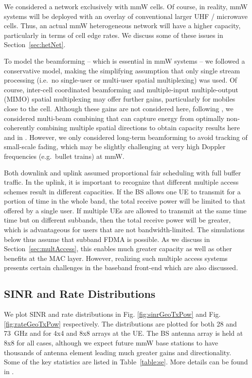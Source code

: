\documentclass[journal]{IEEEtran}
\begin{document}
We considered a network exclusively with mmW cells.  Of course,
in reality, mmW systems will be deployed with an overlay of conventional
larger UHF / microwave cells.  Thus, an actual mmW heterogeneous network
will have a higher capacity, particularly in terms of cell edge rates.
We discuss some of these issues in Section~\ref{sec:hetNet}.

To model the beamforming -- which is essential in mmW systems --  we followed a
conservative model, making
the simplifying assumption that only single stream processing
(i.e.\ no single-user or multi-user spatial multiplexing) was used.
Of course, inter-cell coordinated beamforming and multiple-input multiple-output
(MIMO) spatial multiplexing \cite{ZhangMadhow1,Heath:partialBF} may offer further
 gains, particularly for mobiles close to the cell.  Although these gains
are not considered here, following \cite{Sun-Beam:13}, we considered
multi-beam combining that can capture energy from optimally non-coherently combining
multiple spatial directions
to obtain capacity results here and
in \cite{AkLiuRanRapEr:13-arxiv}.
However, we only considered long-term beamforming \cite{Lozano:07}
to avoid tracking of small-scale fading, which may be slightly challenging at very high
Doppler frequencies (e.g.\ bullet trains) at mmW.


Both downlink and uplink assumed
proportional fair scheduling with full buffer traffic.
In the uplink, it is important to recognize that
different multiple access schemes result in different capacities. If
the BS allows one UE to transmit for a portion of time in the whole band,
the total receive power will be limited to that offered by a single user. If
multiple UEs are allowed to transmit at the same time
time but on different subbands, then the total receive power will be greater,
which is advantageous for users that are not bandwidth-limited. The simulations below thus
assume that subband FDMA is possible.
As we discuss in Section~\ref{sec:multAccess}, this enables much greater capacity
as well as other benefits at the MAC layer.  However, realizing such multiple
access systems presents certain challenges in the baseband front-end which are also
discussed.

\subsection{SINR and Rate Distributions}

We plot SINR and rate distributions in Fig. \ref{fig:sinrGeoTxPow} and Fig. \ref{fig:rateGeoTxPow} respectively. The distributions are plotted for
both 28 and 73~GHz and for 4x4 and 8x8 arrays at the UE.  The BS antenna
array is held at 8x8 for all cases,
although we expect future mmW base stations to have thousands of antenna element
leading much greater gains and directionality.
Some of the key statistics are listed in Table~\ref{table:se}.
More details can be found in \cite{AkLiuRanRapEr:13-arxiv}.
\end{document}
